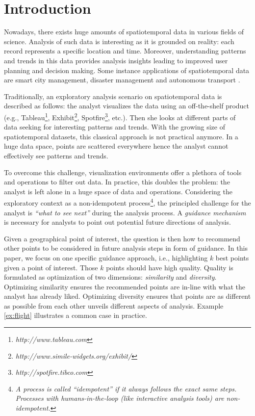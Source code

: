 \section{Introduction} 
Nowadays, there exists huge amounts of spatiotemporal data in various fields of science.
Analysis of such data is interesting as it is grounded
on reality: each record represents a specific location and time. Moreover, understanding patterns and trends in this data provides analysis insights leading to improved user planning and decision making. Some instance applications of spatiotemporal data are smart city management, disaster management and autonomous transport \cite{RoddickEHPS04,Telang:2012}.

Traditionally, an exploratory analysis scenario on spatiotemporal data is described as follows: the analyst visualizes the data using an off-the-shelf product (e.g., Tableau\footnote{\it http://www.tableau.com}, Exhibit\footnote{\it http://www.simile-widgets.org/exhibit/}, Spotfire\footnote{\it http://spotfire.tibco.com}, etc.). Then she looks at different parts of data seeking for interesting patterns and trends. With the growing size of spatiotemporal datasets, this classical approach is not practical anymore. In a huge data space, points are scattered everywhere hence the analyst cannot effectively see patterns and trends.

To overcome this challenge, visualization environments offer a plethora of tools and operations to filter out data. In practice, this doubles the problem: the analyst is left alone in a huge space of data and operations. Considering the exploratory context as a non-idempotent process\footnote{\it A process is called ``idempotent'' if it always follows the exact same steps. Processes with humans-in-the-loop (like interactive analysis tools) are non-idempotent.}, the principled challenge for the analyst is {\em ``what to see next''} during the analysis process. A {\em guidance mechanism} is necessary for analysts to point out potential future directions of analysis.

Given a geographical point of interest, the question is then how to recommend other points to be considered in future analysis steps in form of guidance. In this paper, we focus on one specific guidance approach, i.e., highlighting $k$ best points given a point of interest. Those $k$ points should have high quality. Quality is formulated as optimization of two dimensions: {\em similarity} and {\em diversity}. Optimizing similarity ensures the recommended points are in-line with what the analyst has already liked. Optimizing diversity ensures that points are as different as possible from each other unveils different aspects of analysis. Example \ref{ex:flight} illustrates a common case in practice.


